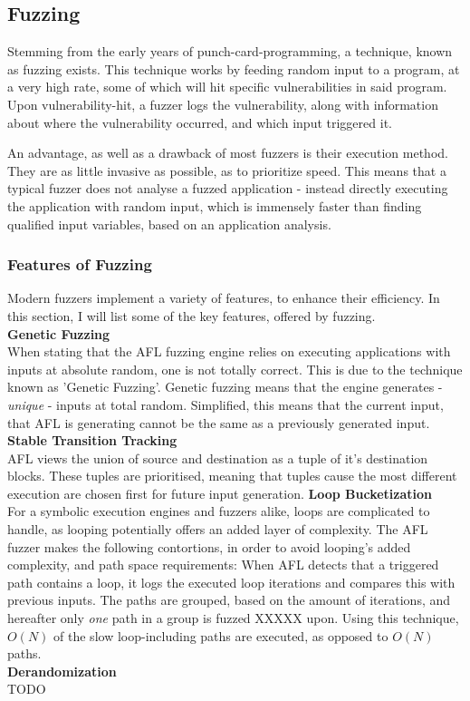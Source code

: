 \documentclass[a4paper]{article}
\newcommand{\tbf}[1]{\textbf{#1}}
\newcommand{\tit}[1]{\textit{#1}}
\begin{document}
\subsection{Fuzzing}
Stemming from the early years of punch-card-programming, a technique, known as fuzzing exists. This technique works by feeding random input to a program, at a very high rate, some of which will hit specific vulnerabilities in said program. Upon vulnerability-hit, a fuzzer logs the vulnerability, along with information about where the vulnerability occurred, and which input triggered it.

An advantage, as well as a drawback of most fuzzers is their execution method. They are as little invasive as possible, as to prioritize speed. This means that a typical fuzzer does not analyse a fuzzed application - instead directly executing the application with random input, which is immensely faster than finding qualified input variables, based on an application analysis.
\subsubsection*{Features of Fuzzing}

Modern fuzzers implement a variety of features, to enhance their efficiency. In this section, I will list some of the key features, offered by fuzzing.\\
\tbf{Genetic Fuzzing}\\
When stating that the AFL fuzzing engine relies on executing applications with inputs at absolute random, one is not totally correct. This is due to the technique known as 'Genetic Fuzzing'. Genetic fuzzing means that the engine generates - \tit{unique} - inputs at total random. Simplified, this means that the current input, that AFL is generating cannot be the same as a previously generated input.  
\tbf{Stable Transition Tracking}\\
AFL views the union of source and destination as a tuple of it's destination blocks.  These tuples are prioritised, meaning that tuples cause the most different execution are chosen first for future input generation.
\tbf{Loop Bucketization}\\
For a symbolic execution engines and fuzzers alike, loops are complicated to handle, as looping potentially offers an added layer of complexity. The AFL fuzzer makes the following contortions, in order to avoid looping's added complexity, and path space requirements:
When AFL detects that a triggered path contains a loop, it logs the executed loop iterations and compares this with previous inputs. The paths are grouped, based on the amount of iterations, and hereafter only \tit{one} path in a group is fuzzed XXXXX upon. Using this technique, $O(N)$ of the slow loop-including paths are executed, as opposed to $O(N)$ paths.\\
\tbf{Derandomization}\\
 TODO
\newpage
\end{document}
